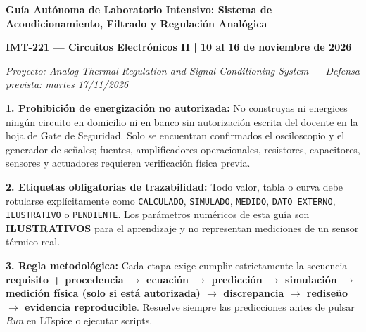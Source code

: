 \documentclass[11pt, a4paper]{article}
\begin{document}
\begin{center}
    {\LARGE \textbf{Guía Autónoma de Laboratorio Intensivo: Sistema de Acondicionamiento, Filtrado y Regulación Analógica}}
    \par\vspace{0.2cm}
    {\large \textbf{IMT-221 — Circuitos Electrónicos II | 10 al 16 de noviembre de 2026}}
    \par\vspace{0.1cm}
    \textit{Proyecto: Analog Thermal Regulation and Signal-Conditioning System — Defensa prevista: martes 17/11/2026}
\end{center}

\begin{tcolorbox}[colback=red!5, colframe=red!80!black, title=\textbf{Advertencia Crítica de Seguridad, Procedencia y Alcance}]
    \textbf{1. Prohibición de energización no autorizada:} No construyas ni energices ningún circuito en domicilio ni en banco sin autorización escrita del docente en la hoja de Gate de Seguridad. Solo se encuentran confirmados el osciloscopio y el generador de señales; fuentes, amplificadores operacionales, resistores, capacitores, sensores y actuadores requieren verificación física previa.
    \par\vspace{0.15cm}
    \textbf{2. Etiquetas obligatorias de trazabilidad:} Todo valor, tabla o curva debe rotularse explícitamente como \texttt{CALCULADO}, \texttt{SIMULADO}, \texttt{MEDIDO}, \texttt{DATO EXTERNO}, \texttt{ILUSTRATIVO} o \texttt{PENDIENTE}. Los parámetros numéricos de esta guía son \textbf{ILUSTRATIVOS} para el aprendizaje y no representan mediciones de un sensor térmico real.
    \par\vspace{0.15cm}
    \textbf{3. Regla metodológica:} Cada etapa exige cumplir estrictamente la secuencia \textbf{requisito + procedencia $\to$ ecuación $\to$ predicción $\to$ simulación $\to$ medición física (solo si está autorizada) $\to$ discrepancia $\to$ rediseño $\to$ evidencia reproducible}. Resuelve siempre las predicciones antes de pulsar \textit{Run} en LTspice o ejecutar scripts.
\end{tcolorbox}
\end{document}
